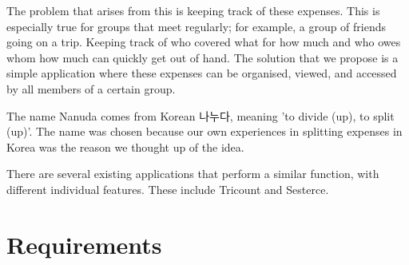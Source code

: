 \documentclass[conference]{IEEEtran}
\begin{document}
The problem that arises from this is keeping track of these expenses. This is especially true for groups that meet regularly; for example, a group of friends going on a trip. Keeping track of who covered what for how much and who owes whom how much can quickly get out of hand. The solution that we propose is a simple application where these expenses can be organised, viewed, and accessed by all members of a certain group.

The name Nanuda comes from Korean 나누다, meaning 'to divide (up), to split (up)'. The name was chosen because our own experiences in splitting expenses in Korea was the reason we thought up of the idea.

There are several existing applications that perform a similar function, with different individual features. These include Tricount and Sesterce.
\section{Requirements}
\end{document}
